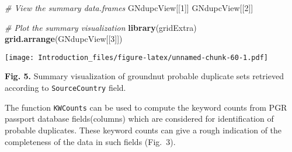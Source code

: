 \documentclass[
]{article}
\newenvironment{Shaded}{\begin{snugshade}}{\end{snugshade}}
\newcommand{\CommentTok}[1]{\textcolor[rgb]{0.56,0.35,0.01}{\textit{#1}}}
\newcommand{\DecValTok}[1]{\textcolor[rgb]{0.00,0.00,0.81}{#1}}
\newcommand{\KeywordTok}[1]{\textcolor[rgb]{0.13,0.29,0.53}{\textbf{#1}}}
\newcommand{\NormalTok}[1]{#1}
\begin{document}
\begin{Shaded}
\begin{Highlighting}[]
\CommentTok{# View the summary data.frames}
\NormalTok{GNdupcView[[}\DecValTok{1}\NormalTok{]]}
\NormalTok{GNdupcView[[}\DecValTok{2}\NormalTok{]]}
\end{Highlighting}
\end{Shaded}

\begin{Shaded}
\begin{Highlighting}[]
\CommentTok{# Plot the summary visualization}
\KeywordTok{library}\NormalTok{(gridExtra)}
\KeywordTok{grid.arrange}\NormalTok{(GNdupcView[[}\DecValTok{3}\NormalTok{]])}
\end{Highlighting}
\end{Shaded}

\texttt{[image: Introduction\_files/figure-latex/unnamed-chunk-60-1.pdf]}

\textbf{Fig. 5.} Summary visualization of groundnut probable duplicate
sets retrieved according to \texttt{SourceCountry} field.

The function \texttt{KWCounts} can be used to compute the keyword counts
from PGR passport database fields(columns) which are considered for
identification of probable duplicates. These keyword counts can give a
rough indication of the completeness of the data in such fields
(Fig.~3).
\end{document}
